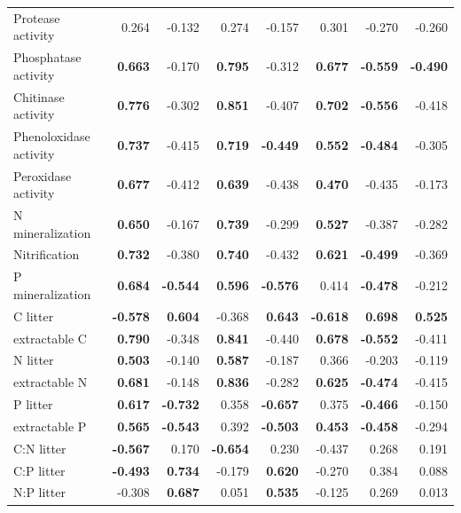 \documentclass[10pt]{article}
\begin{document}
\begin{flushleft}
\begin{landscape}
\begin{table}[h!]
{\begin{tabular}{lrrrrrrr}
  Protease activity & 0.264 & -0.132 & 0.274 & -0.157 & 0.301 & -0.270 & -0.260 \\ 
  Phosphatase activity & \textbf{ 0.663 } & -0.170 & \textbf{ 0.795 } & -0.312 & \textbf{ 0.677 } & \textbf{ -0.559 } & \textbf{ -0.490 } \\ 
  Chitinase activity & \textbf{ 0.776 } & -0.302 & \textbf{ 0.851 } & -0.407 & \textbf{ 0.702 } & \textbf{ -0.556 } & -0.418 \\ 
  Phenoloxidase activity & \textbf{ 0.737 } & -0.415 & \textbf{ 0.719 } & \textbf{ -0.449 } & \textbf{ 0.552 } & \textbf{ -0.484 } & -0.305 \\ 
  Peroxidase activity & \textbf{ 0.677 } & -0.412 & \textbf{ 0.639 } & -0.438 & \textbf{ 0.470 } & -0.435 & -0.173 \\ 
  N mineralization & \textbf{ 0.650 } & -0.167 & \textbf{ 0.739 } & -0.299 & \textbf{ 0.527 } & -0.387 & -0.282 \\ 
  Nitrification & \textbf{ 0.732 } & -0.380 & \textbf{ 0.740 } & -0.432 & \textbf{ 0.621 } & \textbf{ -0.499 } & -0.369 \\ 
  P mineralization & \textbf{ 0.684 } & \textbf{ -0.544 } & \textbf{ 0.596 } & \textbf{ -0.576 } & 0.414 & \textbf{ -0.478 } & -0.212 \\ 
  C litter & \textbf{ -0.578 } & \textbf{ 0.604 } & -0.368 & \textbf{ 0.643 } & \textbf{ -0.618 } & \textbf{ 0.698 } & \textbf{ 0.525 } \\ 
  extractable C & \textbf{ 0.790 } & -0.348 & \textbf{ 0.841 } & -0.440 & \textbf{ 0.678 } & \textbf{ -0.552 } & -0.411 \\ 
  N litter & \textbf{ 0.503 } & -0.140 & \textbf{ 0.587 } & -0.187 & 0.366 & -0.203 & -0.119 \\ 
  extractable N & \textbf{ 0.681 } & -0.148 & \textbf{ 0.836 } & -0.282 & \textbf{ 0.625 } & \textbf{ -0.474 } & -0.415 \\ 
  P litter & \textbf{ 0.617 } & \textbf{ -0.732 } & 0.358 & \textbf{ -0.657 } & 0.375 & \textbf{ -0.466 } & -0.150 \\ 
  extractable P & \textbf{ 0.565 } & \textbf{ -0.543 } & 0.392 & \textbf{ -0.503 } & \textbf{ 0.453 } & \textbf{ -0.458 } & -0.294 \\ 
  C:N litter & \textbf{ -0.567 } & 0.170 & \textbf{ -0.654 } & 0.230 & -0.437 & 0.268 & 0.191 \\ 
  C:P litter & \textbf{ -0.493 } & \textbf{ 0.734 } & -0.179 & \textbf{ 0.620 } & -0.270 & 0.384 & 0.088 \\ 
  N:P litter & -0.308 & \textbf{ 0.687 } & 0.051 & \textbf{ 0.535 } & -0.125 & 0.269 & 0.013 \\ 

\end{tabular}}
\end{table}
\end{landscape}
\end{flushleft}
\end{document}
